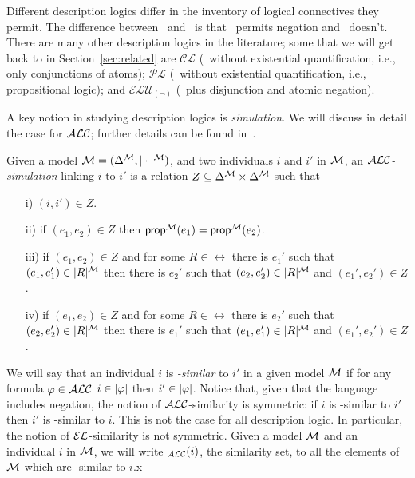 Different description logics differ in the inventory of logical
connectives they permit.  The difference between \alc\ and \el\ is
that \alc\ permits negation and \el\ doesn't.  There are many other
description logics in the literature; some that we will get back to in
Section~\ref{sec:related} are $\mathcal{CL}$ (\el\ without existential
quantification, i.e., only conjunctions of atoms); $\mathcal{PL}$
(\alc\ without existential quantification, i.e., propositional logic);
and $\mathcal{ELU}_{(\neg)}$ (\el\ plus disjunction and atomic
negation).

A key notion in studying description logics is \emph{simulation}.
We will discuss in detail the case for $\mathcal{ALC}$; further details can be
found in~\cite{blac:moda01,kurt:expr99}.

\begin{definition}
Given a model $\mathcal{M} = (\Delta^{\mathcal{M}},|\cdot|^{\mathcal{M}})$, and two individuals $i$ and $i'$ in $\mathcal{M}$, an \emph{$\mathcal{ALC}$-simulation} linking $i$ to $i'$  is a relation $Z
\subseteq \Delta^{\mathcal{M}} \times \Delta^{\mathcal{M}}$ such that 
\begin{itemize}
\item[i)] $(i,i') \in Z$.\\[-1.5em]
\item[ii)] if $(e_1, e_2) \in Z$ then $\textsf{prop}^{\mathcal{M}}(e_1) = \textsf{prop}^{\mathcal{M}}(e_2)$.\\[-1.5em]
\item[iii)] if $(e_1,e_2) \in Z$ and for some $R \in \rel$ there is $e_1'$ such that
$(e_1,e_1') \in |R|^{\mathcal{M}}$ then there is $e_2'$ such that $(e_2,e_2') \in |R|^{\mathcal{M}}$ and
$(e_1',e_2') \in Z$.\\[-1.5em]
\item[iv)] if $(e_1,e_2) \in Z$ and for some $R \in \rel$ there is $e_2'$ such that
$(e_2,e_2') \in |R|^{\mathcal{M}}$ then there is $e_1'$ such that $(e_1,e_1') \in |R|^{\mathcal{M}}$ and
$(e_1',e_2') \in Z$.
\end{itemize}
\end{definition}

We will say that an individual $i$ is \emph{\alc-similar} to $i'$
in a given model $\mathcal{M}$ if for any formula $\varphi \in \mathcal{ALC}$ $i \in |\varphi|$ then
$i' \in |\varphi|$.  Notice that, given that the language includes negation,
the notion of $\mathcal{ALC}$-similarity is symmetric: if $i$ is \alc-similar to $i'$ then
$i'$ is \alc-similar to $i$.  This is not the case for all description
logic.  In particular, the notion of $\mathcal{EL}$-similarity is not symmetric.
Given a model $\mathcal{M}$ and an individual $i$ in $\mathcal{M}$, we will write \simm$_\mathcal{ALC}(i)$, the similarity set, to all the elements of $\mathcal{M}$ which are \alc-similar to $i$.x


